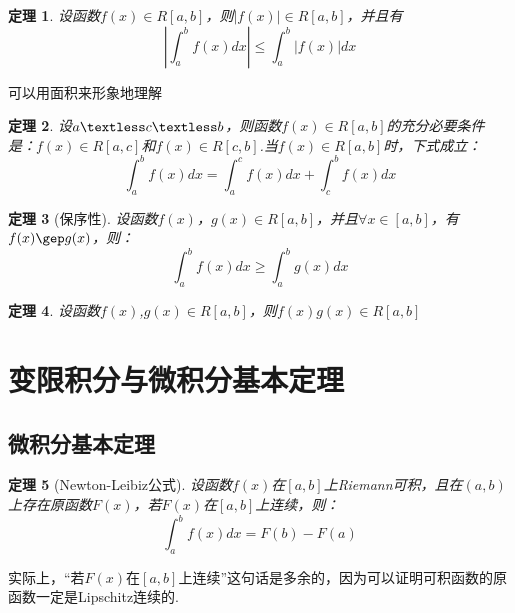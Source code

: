 \documentclass[12pt, a4paper, oneside]{ctexart}
\newtheorem{theorem}{定理}[section]
\begin{document}
\begin{theorem}
设函数$f(x)\in R[a,b]$，则$|f(x)| \in R[a,b]$，并且有
\begin{equation*}
    \left|\int_a^bf(x)dx\right|\leq \int_a^b\left|f(x)\right|dx
\end{equation*}
\end{theorem}

\begin{note}
可以用面积来形象地理解
\end{note}

\begin{theorem}
设$a \textless c \textless b$，则函数$f(x)\in R[a,b]$的充分必要条件是：$f(x)\in R[a,c]$和$f(x)\in R[c,b]$.当$f(x)\in R[a,b]$时，下式成立：
\begin{equation*}
    \int_a^bf(x)dx= \int_a^cf(x)dx+ \int_c^bf(x)dx
\end{equation*}
\end{theorem}

\begin{theorem}[保序性]
设函数$f(x)$，$g(x)\in R[a,b]$，并且$\forall x \in [a,b]$，有$f(x)\gep g(x)$，则：
\begin{equation*}
    \int_a^bf(x)dx\geq \int_a^bg(x)dx
\end{equation*}
\end{theorem}

\begin{theorem}
设函数$f(x)$,$g(x)\in R[a,b]$，则$f(x)g(x)\in R[a,b]$
\end{theorem}

\section{变限积分与微积分基本定理}
\subsection{微积分基本定理}
\begin{theorem}[Newton-Leibiz公式]
设函数$f(x)$在$[a,b]$上Riemann可积，且在$(a,b)$上存在原函数$F(x)$，若$F(x)$在$[a,b]$上连续，则：
\begin{equation*}
    \int_a^bf(x)dx=F(b)-F(a)
\end{equation*}
\end{theorem}

\begin{note}
实际上，“若$F(x)$在$[a,b]$上连续”这句话是多余的，因为可以证明可积函数的原函数一定是Lipschitz连续的.
\end{note}
\end{document}
